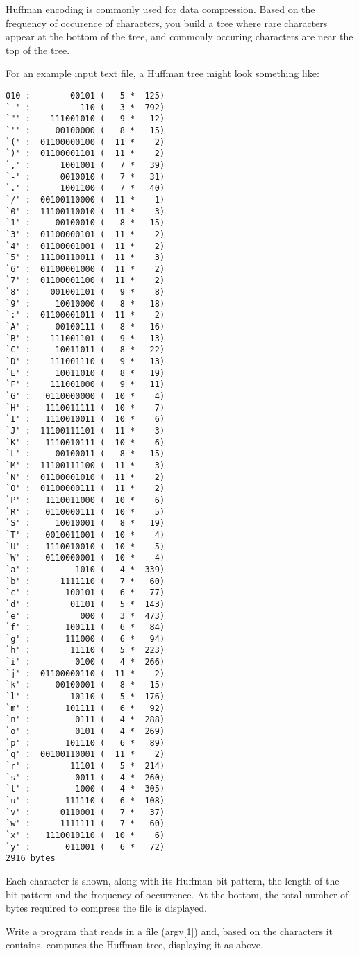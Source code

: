 Huffman encoding is commonly used for data compression.
Based on the frequency of occurence of characters, you build
a tree where rare characters appear at the bottom of the tree, and
commonly occuring characters are near the top of the tree.

For an example input text file, a Huffman tree might look something like:

{\small
\begin{verbatim}
010 :        00101 (   5 *  125)
` ' :          110 (   3 *  792)
`"' :    111001010 (   9 *   12)
`'' :     00100000 (   8 *   15)
`(' :  01100000100 (  11 *    2)
`)' :  01100001101 (  11 *    2)
`,' :      1001001 (   7 *   39)
`-' :      0010010 (   7 *   31)
`.' :      1001100 (   7 *   40)
`/' :  00100110000 (  11 *    1)
`0' :  11100110010 (  11 *    3)
`1' :     00100010 (   8 *   15)
`3' :  01100000101 (  11 *    2)
`4' :  01100001001 (  11 *    2)
`5' :  11100110011 (  11 *    3)
`6' :  01100001000 (  11 *    2)
`7' :  01100001100 (  11 *    2)
`8' :    001001101 (   9 *    8)
`9' :     10010000 (   8 *   18)
`:' :  01100001011 (  11 *    2)
`A' :     00100111 (   8 *   16)
`B' :    111001101 (   9 *   13)
`C' :     10011011 (   8 *   22)
`D' :    111001110 (   9 *   13)
`E' :     10011010 (   8 *   19)
`F' :    111001000 (   9 *   11)
`G' :   0110000000 (  10 *    4)
`H' :   1110011111 (  10 *    7)
`I' :   1110010011 (  10 *    6)
`J' :  11100111101 (  11 *    3)
`K' :   1110010111 (  10 *    6)
`L' :     00100011 (   8 *   15)
`M' :  11100111100 (  11 *    3)
`N' :  01100001010 (  11 *    2)
`O' :  01100000111 (  11 *    2)
`P' :   1110011000 (  10 *    6)
`R' :   0110000111 (  10 *    5)
`S' :     10010001 (   8 *   19)
`T' :   0010011001 (  10 *    4)
`U' :   1110010010 (  10 *    5)
`W' :   0110000001 (  10 *    4)
`a' :         1010 (   4 *  339)
`b' :      1111110 (   7 *   60)
`c' :       100101 (   6 *   77)
`d' :        01101 (   5 *  143)
`e' :          000 (   3 *  473)
`f' :       100111 (   6 *   84)
`g' :       111000 (   6 *   94)
`h' :        11110 (   5 *  223)
`i' :         0100 (   4 *  266)
`j' :  01100000110 (  11 *    2)
`k' :     00100001 (   8 *   15)
`l' :        10110 (   5 *  176)
`m' :       101111 (   6 *   92)
`n' :         0111 (   4 *  288)
`o' :         0101 (   4 *  269)
`p' :       101110 (   6 *   89)
`q' :  00100110001 (  11 *    2)
`r' :        11101 (   5 *  214)
`s' :         0011 (   4 *  260)
`t' :         1000 (   4 *  305)
`u' :       111110 (   6 *  108)
`v' :      0110001 (   7 *   37)
`w' :      1111111 (   7 *   60)
`x' :   1110010110 (  10 *    6)
`y' :       011001 (   6 *   72)
2916 bytes
\end{verbatim}
}

Each character is shown, along with its Huffman bit-pattern, the length
of the bit-pattern and the frequency of occurrence. At the bottom, the total
number of bytes required to compress the file is displayed.

\begin{exercise}
Write a program that reads in a file (argv[1]) and, based on the characters
it contains, computes the Huffman tree, displaying it as above. 
\end{exercise}
